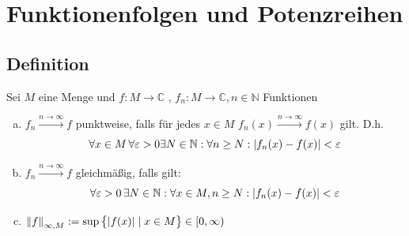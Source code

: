 
\newcommand{\fach}{Analysis }
\newcommand{\semester}{SoSe 2013}
\newcommand{\homepage}{http://wwwmath.uni-muenster.de/u/wilhelm.winter/wwinter/analysis_II.html}
\newcommand{\prof}{Prof.\,Dr.\,Wilhelm Winter}




\maketitle
\begin{abstract}

\end{abstract}

\setcounter{page}{1}
\tableofcontents
\cleardoubleoddemptypage
{}
\setcounter{page}{1}


\section{Funktionenfolgen und Potenzreihen} %
\label{sec:funktionenfolgen_und_potenzreihen}

\subsection[Definition Konvergenz von Funktionenfolgen]{Definition} %
\label{sub:11}
Sei $M$ eine Menge und $f : M \to \mathds{C}$ , $f_n : M \to \mathds{C}, n \in \mathds{N} $ Funktionen 
\begin{enumerate}[a)]
	\item $f_n \xrightarrow{n \to \infty} f$ punktweise, falls für jedes $x \in M$ $f_n(x) \xrightarrow{n \to \infty} f(x)$ gilt. D.h.
	\[
		\forall x \in M \, \forall \varepsilon > 0 \exists N \in \mathbb{N} : \forall n \ge N : \lvert f_n(x) - f(x)\rvert < \varepsilon
	\]
	\item $f_n \xrightarrow{n \to \infty} f$ gleichmäßig, falls gilt: 
	\[
		\forall \varepsilon >0 \, \exists N \in \mathbb{N} : \forall x \in M , n \ge N : \lvert f_n(x) - f(x)\rvert < \varepsilon
	\]
	\item $\norm[\infty, M]{f} := \sup \big\{ \abs{f(x)} \mid x \in M \big\} \in [0, \infty)$
\end{enumerate}

